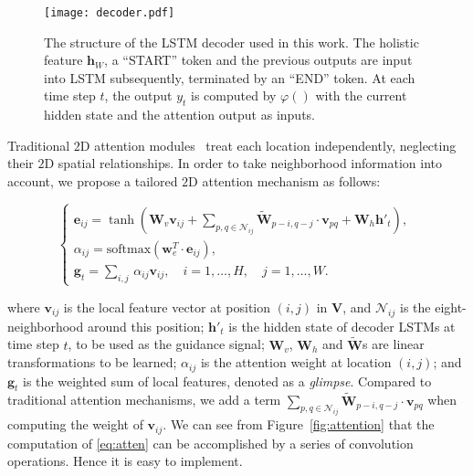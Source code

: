 \documentclass[letterpaper]{article} \usepackage{aaai19}  \usepackage{times}  \usepackage{helvet}  \usepackage{courier}  \usepackage{url}  \usepackage{graphicx}  \usepackage{amsmath}
\begin{document}
\begin{figure}[t]
	\begin{center}
		\texttt{[image: decoder.pdf]}
	\end{center}
	\caption{ The structure of the LSTM decoder used in this work. The holistic feature $\mathbf{h}_{W}$, a ``START'' token and the previous outputs are input into LSTM subsequently,
		terminated by an ``END'' token. At each time step $t$, the output $y_t$ is computed by $\varphi()$ with the current hidden state and the attention output as inputs.
	}
	\label{fig:decoder}
\end{figure}

Traditional $2$D attention modules~\cite{xu2015show} treat each location independently, neglecting their $2$D spatial relationships.
In order to take neighborhood information into account, we propose a tailored $2$D attention mechanism as follows:
\begin{small}
\begin{equation}
\begin{cases}
\mathbf{e}_{ij} = \tanh( \mathbf{W}_v \mathbf{v}_{ij} + \!\displaystyle{\sum_{p,q \in \mathcal{N}_{ij}}}\! {\mathbf{\tilde{W}}_{p-i,q-j} \cdot \mathbf{v}_{pq}} + \mathbf{W}_h \mathbf{h}'_t), \,\, \\
{\alpha}_{ij} = \mathrm{softmax} (\mathbf{w}_e^T \cdot \mathbf{e}_{ij}), \\
\mathbf{g}_t = \!\displaystyle{\sum_{i,j}} \, \alpha_{ij} \mathbf{v}_{ij},  \quad  i = 1, \dots, H, \quad j = 1, \dots, W.
\end{cases}
\label{eq:atten}
\end{equation}
\end{small}
where $\mathbf{v}_{ij}$ is the local feature vector at position $(i,j)$ in $\mathbf{V}$,
and $\mathcal{N}_{ij}$ is the eight-neighborhood around this position;
$\mathbf{h}'_t$ is the hidden state of decoder LSTMs at time step $t$, to be used as the guidance signal;
$\mathbf{W}_v$, $\mathbf{W}_h$
and $\mathbf{\tilde{W}}$s
are linear transformations to be learned; ${\alpha}_{ij}$ is the attention weight at location $(i,j)$; and $\mathbf{g}_t$ is the weighted sum of local features, denoted as a \textit{glimpse}.
Compared to traditional attention mechanisms, we add a term ${\sum_{p,q \in \mathcal{N}_{ij}}}\! {\mathbf{\tilde{W}}_{p-i,q-j} \cdot \mathbf{v}_{pq}}$ when computing the weight of $\mathbf{v}_{ij}$.
We can see from Figure~\ref{fig:attention} that the computation of \eqref{eq:atten} can be accomplished by a series of convolution operations.
Hence it is easy to implement.
\end{document}
